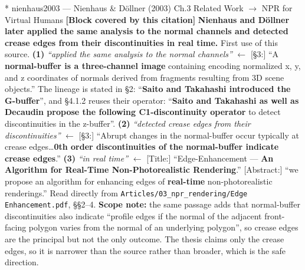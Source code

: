 \documentclass[11pt, a4paper]{article}
\makeatletter
\newcounter{citentry}
\newcommand{\citentry@core}[7]{%
  \stepcounter{citentry}
  \begingroup
  \sbox{\citentry@measurebox}{%
    \begin{minipage}{\linewidth}
      \noindent\colorbox{konstanzblue}{\parbox{\dimexpr\linewidth-2\fboxsep}{%
        \vspace{3pt}
        \textbf{\#\thecitentry \quad #2} \hfill \textit{#3}
        \vspace{3pt}
      }}
      \vspace{3pt}
      \noindent\begin{tabular}{@{}p{2.7cm} p{\dimexpr\linewidth-3cm}@{}}
        \textit{\small Sentence in thesis:} & #4 \\[5pt]
        \textbf{Usage:}\hfill       & #5 \\[5pt]
        \textit{\small Original source:}     & #6 \\[5pt]
        \textbf{How to check:}             & #7 \\
      \end{tabular}
      \vspace{5pt}
      \rule{10pt}{10pt}\quad \textbf{Validated} --- I have read the original and agree it supports the sentence.
    \end{minipage}%
  }%
  \Needspace{\dimexpr\ht\citentry@measurebox+\dp\citentry@measurebox\relax}%
  \endgroup
  \vspace{10pt}
  \noindent\colorbox{konstanzblue}{\parbox{\dimexpr\linewidth-2\fboxsep}{%
    \vspace{3pt}
    \textcolor{white}{\textbf{\#\thecitentry \quad #2}} \hfill \textcolor{white}{\textit{#3}}
    \vspace{3pt}
  }}
  \vspace{3pt}
  \noindent\begin{tabular}{@{}p{2.7cm} p{\dimexpr\linewidth-3cm}@{}}
    \textit{\small Sentence in thesis:} & \textcolor{darkgreen}{#4} \\[5pt]
    \textbf{Usage:}\hfill       & #5 \\[5pt]
    \textit{\small Original source:}     & \textcolor{darkred}{#6} \\[5pt]
    \textbf{How to check:}             & #7 \\
  \end{tabular}
  \vspace{5pt}
  \noindent\CheckBox[name=verified\thecitentry, width=10pt, height=10pt, bordercolor={0 0 0}, borderwidth=0.75, backgroundcolor={1 1 1}#1]{}\quad \textbf{Validated} --- I have read the original and agree it supports the sentence.
  \vspace{3pt}
  \noindent\textcolor{midgray}{\rule{\linewidth}{0.4pt}}
}
\newcommand{\citentry}{\@ifstar{\citentry@core{, checked}}{\citentry@core{}}}
\makeatother
\begin{document}
\begin{Form}
\citentry*
  {nienhaus2003 --- Nienhaus \& D\"ollner (2003)}
  {Ch.3 Related Work $\rightarrow$ NPR for Virtual Humans}
  {\textbf{[Block covered by this citation]} \textbf{Nienhaus and D\"ollner later applied the same analysis to the normal channels and detected crease edges from their discontinuities in real time.}}
  {First use of this source.}
  {\textbf{(1)} \emph{``applied the same analysis to the normal channels''} $\leftarrow$ [\S3:] ``A \textbf{normal-buffer is a three-channel image} containing encoding normalized x, y, and z coordinates of normals derived from fragments resulting from 3D scene objects.'' The lineage is stated in \S2: ``\textbf{Saito and Takahashi introduced the G-buffer}'', and \S4.1.2 reuses their operator: ``\textbf{Saito and Takahashi as well as Decaudin propose the following C1-discontinuity operator} to detect discontinuities in the z-buffer''. \quad \textbf{(2)} \emph{``detected crease edges from their discontinuities''} $\leftarrow$ [\S3:] ``Abrupt changes in the normal-buffer occur typically at crease edges\ldots \textbf{0th order discontinuities of the normal-buffer indicate crease edges}.'' \quad \textbf{(3)} \emph{``in real time''} $\leftarrow$ [Title:] ``Edge-Enhancement --- \textbf{An Algorithm for Real-Time Non-Photorealistic Rendering}.'' [Abstract:] ``we propose an algorithm for enhancing edges of \textbf{real-time} non-photorealistic renderings.''}
  {Read directly from \texttt{\footnotesize Articles/03\_npr\_rendering/Edge Enhancement.pdf}, \S\S2--4. \textbf{Scope note:} the same passage adds that normal-buffer discontinuities also indicate ``profile edges if the normal of the adjacent front-facing polygon varies from the normal of an underlying polygon'', so crease edges are the principal but not the only outcome. The thesis claims only the crease edges, so it is narrower than the source rather than broader, which is the safe direction.}


\end{Form}
\end{document}
